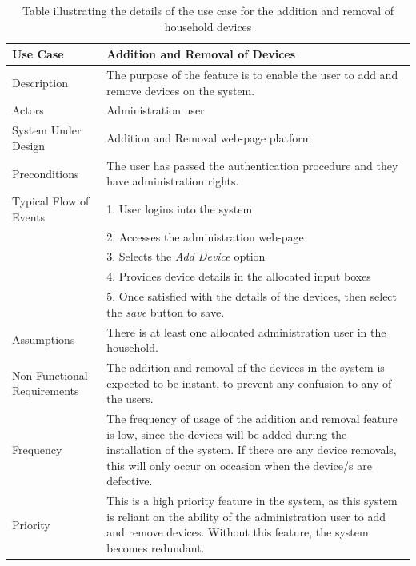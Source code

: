 \documentclass[10pt,twocolumn]{witseiepaper}
\begin{document}
	\begin{table}[H]
		\centering
		\caption{Table illustrating the details of the use case for the addition and removal of household devices}
		\label{addition_removal_use_case}
		\begin{tabular}{| p{22mm} | p{50mm} |}
			\hline
			\textbf{Use Case} & \textbf{Addition and Removal of Devices}\\
			\hline
			Description & The purpose of the feature is to enable the user to add and remove devices on the system. \\
			\hline
			Actors & Administration user \\
			\hline
			System Under Design & Addition and Removal web-page platform \\
			\hline
			Preconditions & The user has passed the authentication procedure and they have administration rights. \\
			\hline
			Typical Flow of Events & 1. User logins into the system\\
			& 2. Accesses the administration web-page \\
			& 3. Selects the \textit{Add Device} option \\
			& 4. Provides device details in the allocated input boxes \\
			& 5. Once satisfied with the details of the devices, then select the \textit{save} button to save. \\
			\hline
			Assumptions & There is at least one allocated administration user in the household.\\
			\hline
			Non-Functional Requirements & The addition and removal of the devices in the system is expected to be instant, to prevent any confusion to any of the users.\\
			\hline
			Frequency & The frequency of usage of the addition and removal feature is low, since the devices will be added during the installation of the system. If there are any device removals, this will only occur on occasion when the device/s are defective.\\
			\hline
			Priority & This is a high priority feature in the system, as this system is reliant on the ability of the administration user to add and remove devices. Without this feature, the system becomes redundant.\\
			\hline
		\end{tabular}
	\end{table}
\end{document}
